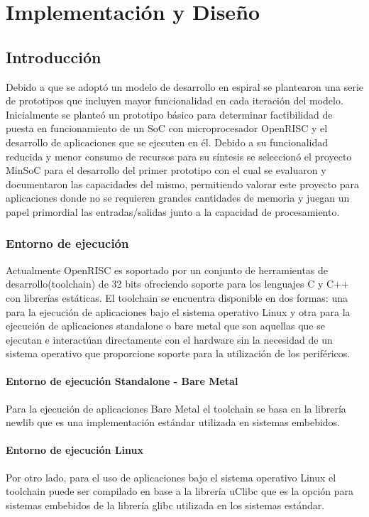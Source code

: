 \chapter{Implementación y Diseño}
	\section{Introducción}
	Debido a que se adoptó un modelo de desarrollo en espiral se plantearon una serie de prototipos que incluyen mayor funcionalidad en cada iteración
	del modelo. Inicialmente se planteó un prototipo básico para determinar factibilidad de puesta en funcionamiento de un SoC con microprocesador
	OpenRISC y el desarrollo de aplicaciones que se ejecuten en él. Debido a su funcionalidad reducida y menor consumo de recursos  para su síntesis se
	seleccionó el proyecto MinSoC para el desarrollo del primer prototipo con el cual se evaluaron y documentaron las capacidades del mismo, permitiendo
	valorar este proyecto para aplicaciones donde no se requieren grandes cantidades de memoria y juegan un papel primordial las entradas/salidas junto
	a la capacidad de procesamiento.  
		 
		\subsection{Entorno de ejecución}
		Actualmente OpenRISC es soportado por un conjunto de herramientas de desarrollo(toolchain) de 32 bits ofreciendo soporte para los lenguajes C y C++
		con librerías estáticas. El toolchain se encuentra disponible en dos formas: una para la ejecución de aplicaciones bajo el sistema operativo Linux y
		otra para la ejecución de aplicaciones standalone o bare metal que son aquellas que se ejecutan e interactúan directamente con el hardware sin la
		necesidad de un sistema operativo que proporcione soporte para la utilización de los periféricos.
		
			\subsubsection{Entorno de ejecución Standalone - Bare Metal}
	    	Para la ejecución de aplicaciones Bare Metal el toolchain se basa en la librería newlib que es una implementación estándar utilizada en
	    	sistemas embebidos. 
	    
			\subsubsection{Entorno de ejecución Linux}
			Por otro lado, para el uso de aplicaciones bajo el sistema operativo Linux el toolchain puede ser compilado en base a la librería uClibc que es la
			opción para sistemas embebidos de la librería glibc utilizada en los sistemas estándar.

